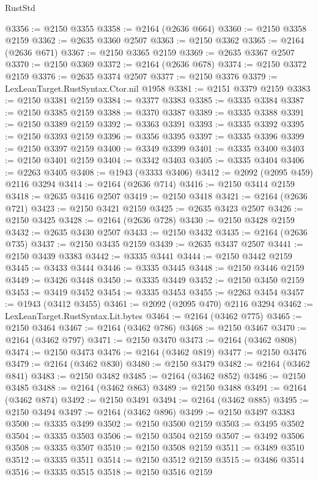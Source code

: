 \begin{lexlean}{RustStd}
\begin{coremodule}
@3356 := @2150 @3355
@3358 := @2164 (@2636 @664)
@3360 := @2150 @3358 @2159
@3362 := @2635 @3360 @2507
@3363 := @2150 @3362
@3365 := @2164 (@2636 @671)
@3367 := @2150 @3365 @2159
@3369 := @2635 @3367 @2507
@3370 := @2150 @3369
@3372 := @2164 (@2636 @678)
@3374 := @2150 @3372 @2159
@3376 := @2635 @3374 @2507
@3377 := @2150 @3376
@3379 := LexLeanTarget.RustSyntax.Ctor.nil @1958
@3381 := @2151 @3379 @2159
@3383 := @2150 @3381 @2159
@3384 := @3377 @3383
@3385 := @3335 @3384
@3387 := @2150 @3385 @2159
@3388 := @3370 @3387
@3389 := @3335 @3388
@3391 := @2150 @3389 @2159
@3392 := @3363 @3391
@3393 := @3335 @3392
@3395 := @2150 @3393 @2159
@3396 := @3356 @3395
@3397 := @3335 @3396
@3399 := @2150 @3397 @2159
@3400 := @3349 @3399
@3401 := @3335 @3400
@3403 := @2150 @3401 @2159
@3404 := @3342 @3403
@3405 := @3335 @3404
@3406 := @2263 @3405
@3408 := @1943 (@3333 @3406)
@3412 := @2092 (@2095 @459) @2116 @3294
@3414 := @2164 (@2636 @714)
@3416 := @2150 @3414 @2159
@3418 := @2635 @3416 @2507
@3419 := @2150 @3418
@3421 := @2164 (@2636 @721)
@3423 := @2150 @3421 @2159
@3425 := @2635 @3423 @2507
@3426 := @2150 @3425
@3428 := @2164 (@2636 @728)
@3430 := @2150 @3428 @2159
@3432 := @2635 @3430 @2507
@3433 := @2150 @3432
@3435 := @2164 (@2636 @735)
@3437 := @2150 @3435 @2159
@3439 := @2635 @3437 @2507
@3441 := @2150 @3439 @3383
@3442 := @3335 @3441
@3444 := @2150 @3442 @2159
@3445 := @3433 @3444
@3446 := @3335 @3445
@3448 := @2150 @3446 @2159
@3449 := @3426 @3448
@3450 := @3335 @3449
@3452 := @2150 @3450 @2159
@3453 := @3419 @3452
@3454 := @3335 @3453
@3455 := @2263 @3454
@3457 := @1943 (@3412 @3455)
@3461 := @2092 (@2095 @470) @2116 @3294
@3462 := LexLeanTarget.RustSyntax.Lit.bytes
@3464 := @2164 (@3462 @775)
@3465 := @2150 @3464
@3467 := @2164 (@3462 @786)
@3468 := @2150 @3467
@3470 := @2164 (@3462 @797)
@3471 := @2150 @3470
@3473 := @2164 (@3462 @808)
@3474 := @2150 @3473
@3476 := @2164 (@3462 @819)
@3477 := @2150 @3476
@3479 := @2164 (@3462 @830)
@3480 := @2150 @3479
@3482 := @2164 (@3462 @841)
@3483 := @2150 @3482
@3485 := @2164 (@3462 @852)
@3486 := @2150 @3485
@3488 := @2164 (@3462 @863)
@3489 := @2150 @3488
@3491 := @2164 (@3462 @874)
@3492 := @2150 @3491
@3494 := @2164 (@3462 @885)
@3495 := @2150 @3494
@3497 := @2164 (@3462 @896)
@3499 := @2150 @3497 @3383
@3500 := @3335 @3499
@3502 := @2150 @3500 @2159
@3503 := @3495 @3502
@3504 := @3335 @3503
@3506 := @2150 @3504 @2159
@3507 := @3492 @3506
@3508 := @3335 @3507
@3510 := @2150 @3508 @2159
@3511 := @3489 @3510
@3512 := @3335 @3511
@3514 := @2150 @3512 @2159
@3515 := @3486 @3514
@3516 := @3335 @3515
@3518 := @2150 @3516 @2159

\end{coremodule}
\end{lexlean}
